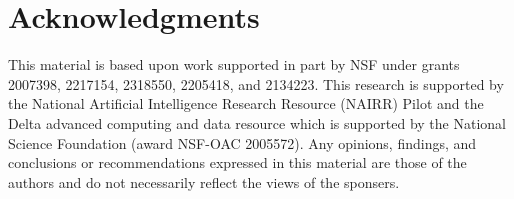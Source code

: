 \section*{Acknowledgments}

This material is based upon work supported in part by NSF under grants 2007398, 2217154, 2318550, 2205418, and 2134223.
This research is supported by the National Artificial Intelligence Research Resource (NAIRR) Pilot and the Delta advanced computing and data resource which is supported by the National Science Foundation (award NSF-OAC 2005572).
Any opinions, findings, and conclusions or recommendations expressed in this material are those of the authors and do not necessarily reflect the views of the sponsers.
